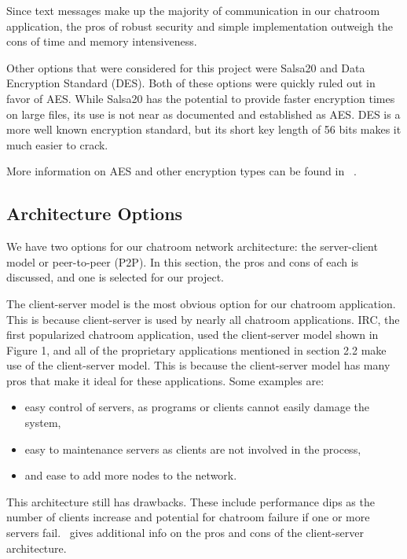 \documentclass{article}
\begin{document}
Since text messages make up the majority of communication in our chatroom application, the pros of robust security and simple implementation outweigh the cons of time and memory intensiveness. 

Other options that were considered for this project were Salsa20 and Data Encryption Standard (DES). Both of these options were quickly ruled out in favor of AES. While Salsa20 has the potential to provide faster encryption times on large files, its use is not near as documented and established as AES. DES is a more well known encryption standard, but its short key length of 56 bits makes it much easier to crack. 

More information on AES and other encryption types can be found in ~\cite{encryption}.

\subsection{Architecture Options}

We have two options for our chatroom network architecture: the server-client model or peer-to-peer (P2P). In this section, the pros and cons of each is discussed, and one is selected for our project. 

The client-server model is the most obvious option for our chatroom application. This is because client-server is used by nearly all chatroom applications. IRC, the first popularized chatroom application, used the client-server model shown in Figure 1, and all of the proprietary applications mentioned in section 2.2 make use of the client-server model. This is because the client-server model has many pros that make it ideal for these applications. Some examples are: 

\begin{itemize}
  \item easy control of servers, as programs or clients cannot easily damage the system,
  \item easy to maintenance servers as clients are not involved in the process,
  \item and ease to add more nodes to the network.
\end{itemize}

This architecture still has drawbacks. These include performance dips as the number of clients increase and potential for chatroom failure if one or more servers fail.~\cite{clientserver} gives additional info on the pros and cons of the client-server architecture.
\end{document}
